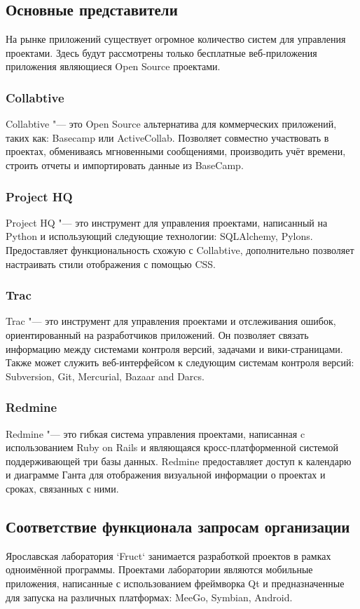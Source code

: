 \subsection{Основные представители}
На рынке приложений существует огромное количество систем для управления
проектами. Здесь будут рассмотрены только бесплатные веб-приложения
приложения являющиеся Open Source проектами.

\subsubsection{Collabtive}
Collabtive "--- это Open Source альтернатива для коммерческих приложений, таких
как: Basecamp или ActiveCollab. Позволяет совместно участвовать в
проектах, обмениваясь мгновенными сообщениями, производить учёт времени,
строить отчеты и импортировать данные из BaseCamp.

\subsubsection{Project HQ}
Project HQ "--- это инструмент для управления проектами, написанный на Python и
использующий следующие технологии: SQLAlchemy, Pylons. Предоставляет
функциональность схожую с Collabtive, дополнительно позволяет настраивать стили
отображения с помощью CSS.

\subsubsection{Trac}
Trac "--- это инструмент для управления проектами и отслеживания ошибок,
ориентированный на разработчиков приложений. Он позволяет связать информацию
между системами контроля версий, задачами и вики-страницами. Также может
служить веб-интерфейсом к следующим системам контроля версий: Subversion, Git,
Mercurial, Bazaar and Darcs.

\subsubsection{Redmine}
Redmine "--- это гибкая система управления проектами, написанная c
использованием Ruby on Rails и являющаяся кросс-платформенной системой
поддерживающей три базы данных. Redmine предоставляет доступ к календарю и
диаграмме Ганта для отображения визуальной информации о проектах и сроках,
связанных с ними.

\subsection{Соответствие функционала запросам организации}
Ярославская лаборатория `Fruct` занимается разработкой проектов в рамках
одноимённой программы. Проектами лаборатории являются мобильные приложения,
написанные с использованием фреймворка Qt и предназначенные для запуска на
различных платформах: MeeGo, Symbian, Android.


